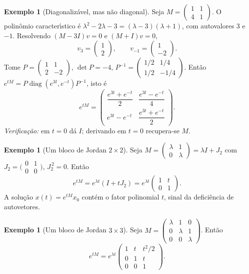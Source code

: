 \documentclass[11pt,a4paper]{amsart}
\DeclareMathOperator{\diag}{diag}
\theoremstyle{plain}
\theoremstyle{definition}
\newtheorem{exemplo}[teorema]{Exemplo}
\theoremstyle{remark}
\begin{document}
\begin{exemplo}[Diagonaliz\'avel, mas n\~ao diagonal]\label{ex:diag}
Seja $M=\begin{pmatrix}1&1\\4&1\end{pmatrix}$. O polin\^omio
caracter\'\i stico \'e $\lambda^2-2\lambda-3=(\lambda-3)(\lambda+1)$, com
autovalores $3$ e $-1$. Resolvendo $(M-3I)v=0$ e $(M+I)v=0$,
\[
  v_3=\begin{pmatrix}1\\2\end{pmatrix},\qquad
  v_{-1}=\begin{pmatrix}1\\-2\end{pmatrix}.
\]
Tome $P=\begin{pmatrix}1&1\\2&-2\end{pmatrix}$, $\det P=-4$,
$P^{-1}=\begin{pmatrix}1/2&1/4\\ 1/2&-1/4\end{pmatrix}$. Ent\~ao
$e^{tM}=P\diag(e^{3t},e^{-t})P^{-1}$, isto \'e
\[
  e^{tM}=\begin{pmatrix}
    \dfrac{e^{3t}+e^{-t}}{2} & \dfrac{e^{3t}-e^{-t}}{4}\\[2mm]
    e^{3t}-e^{-t} & \dfrac{e^{3t}+e^{-t}}{2}
  \end{pmatrix}.
\]
\emph{Verifica\c{c}\~ao:} em $t=0$ d\'a $I$; derivando em $t=0$ recupera-se
$M$.
\end{exemplo}

\begin{exemplo}[Um bloco de Jordan $2\times2$]
Seja $M=\begin{pmatrix}\lambda&1\\0&\lambda\end{pmatrix}=\lambda I+J_2$ com
$J_2=\big(\begin{smallmatrix}0&1\\0&0\end{smallmatrix}\big)$, $J_2^{\,2}=0$.
Ent\~ao
\[
  e^{tM}=e^{\lambda t}(I+tJ_2)
        =e^{\lambda t}\begin{pmatrix}1&t\\0&1\end{pmatrix}.
\]
A solu\c{c}\~ao $x(t)=e^{tM}x_0$ cont\'em o fator polinomial $t$, sinal da
defici\^encia de autovetores.
\end{exemplo}

\begin{exemplo}[Um bloco de Jordan $3\times3$]
Seja $M=\begin{pmatrix}\lambda&1&0\\0&\lambda&1\\0&0&\lambda\end{pmatrix}$.
Ent\~ao
\[
  e^{tM}=e^{\lambda t}
  \begin{pmatrix}1&t&t^2/2\\0&1&t\\0&0&1\end{pmatrix}.
\]
\end{exemplo}
\end{document}
